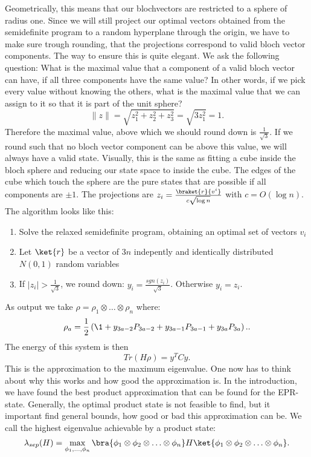Geometrically, this means that our blochvectors are restricted to a sphere of radius one.
Since we will still project our optimal vectors obtained from the semidefinite program to a random hyperplane through the origin, we have to make sure trough rounding, that the projections correspond to valid bloch vector components.
The way to ensure this is quite elegant.
We ask the following question: What is the maximal value that a component of a valid bloch vector can have, if all three components have the same value?
In other words, if we pick every value without knowing the others, what is the maximal value that we can assign to it so that it is part of the unit sphere?\[
\|z\|=\sqrt{z_1^2+z_2^2+z_3^2}=\sqrt{3z_1^2}=1
.\]
Therefore the maximal value, above which we should round down is $\frac{1}{\sqrt{3}}$.
If we round such that no bloch vector component can be above this value, we will always have a valid state.
Visually, this is the same as fitting a cube inside the bloch sphere and reducing our state space to inside the cube.
The edges of the cube which touch the sphere are the pure states that are possible if all components are $\pm 1$.
The projections are $z_i=\frac{\braket{r}{v^i}}{c\sqrt{\log{}n}}$ with $c=O(\log{}n)$.
The algorithm looks like this:
\begin{enumerate}
	\item Solve the relaxed semidefinite program, obtaining an optimal set of vectors $v_i$
	\item Let $\ket{r}$ be a vector of $3n$ indepently and identically distributed $N(0,1)$ random variables
	\item If $|z_i|>\frac{1}{\sqrt{3}}$, we round down: $y_i=\frac{sgn(z_i)}{\sqrt{3}}$. Otherwise $y_i=z_i$.
\end{enumerate}
As output we take $ \rho=\rho_1\otimes\ldots\otimes\rho_n$ where:\[
	\rho_a=\frac{1}{2}\left(\1 +y_{3a-2}P_{3a-2}+y_{3a-1}P_{3a-1}+y_{3a}P_{3a}\right).
.\]
The energy of this system is then \[
	Tr\left(H\rho\right) = y^TCy
.\]
This is the approximation to the maximum eigenvalue.
One now has to think about why this works and how good the approximation is.
In the introduction, we have found the best product approximation that can be found for the EPR-state.
Generally, the optimal product state is not feasible to find, but it important find general bounds, how good or bad this approximation can be.
We call the highest eigenvalue achievable by a product state: \[
	\lambda_{sep}(H)=\max_{\phi_1,\ldots,\phi_n}\bra{\phi_1\otimes\phi_2\otimes\ldots\otimes\phi_n}H\ket{\phi_1\otimes\phi_2\otimes\ldots\otimes\phi_n}
.\]

